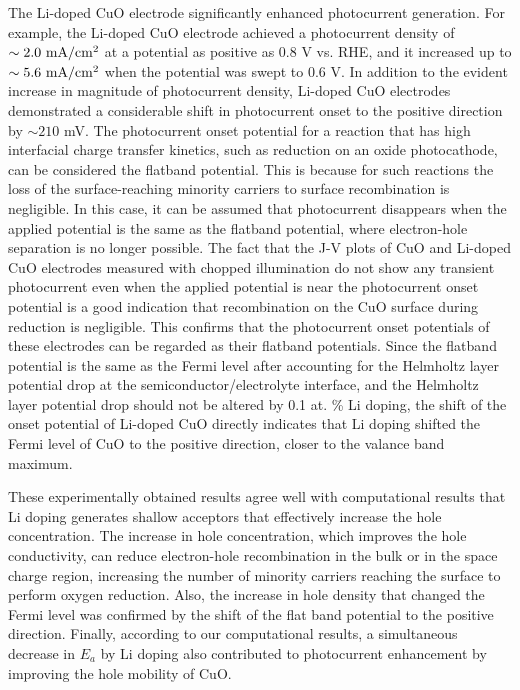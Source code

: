 The Li-doped CuO electrode significantly enhanced photocurrent generation. For example, the Li-doped CuO electrode achieved a photocurrent density of $\sim 2.0\ {\rm mA/cm^2}$ at a potential as positive as 0.8 V vs. RHE, and it increased up to $\sim 5.6\ {\rm mA/cm^2}$ when the potential was swept to 0.6 V. In addition to the evident increase in magnitude of photocurrent density, Li-doped CuO electrodes demonstrated a considerable shift in photocurrent onset to the positive direction by $\sim 210$ mV. The photocurrent onset potential for a reaction that has high interfacial charge transfer kinetics, such as  reduction on an oxide photocathode, can be considered the flatband potential. This is because for such reactions the loss of the surface-reaching minority carriers to surface recombination is negligible.  In this case, it can be assumed that photocurrent disappears when the applied potential is the same as the flatband potential, where electron-hole separation is no longer possible.  The fact that the J-V plots of CuO and Li-doped CuO electrodes measured with chopped illumination do not show any transient photocurrent even when the applied potential is near the photocurrent onset potential is a good indication that recombination on the CuO surface during  reduction is negligible. This confirms that the photocurrent onset potentials of these electrodes can be regarded as their flatband potentials. Since the flatband potential is the same as the Fermi level after accounting for the Helmholtz layer potential drop at the semiconductor/electrolyte interface, and the Helmholtz layer potential drop should not be altered by 0.1 at. \% Li doping, the shift of the onset potential of Li-doped CuO directly indicates that Li doping shifted the Fermi level of CuO to the positive direction, closer to the valance band maximum.\cite{nozik1978photoelectrochemistry}

These experimentally obtained results agree well with computational results that Li doping generates shallow acceptors that effectively increase the hole concentration. The increase in hole concentration, which improves the hole conductivity, can reduce electron-hole recombination in the bulk or in the space charge region, increasing the number of minority carriers reaching the surface to perform oxygen reduction. Also, the increase in hole density that changed the Fermi level was confirmed by the shift of the flat band potential to the positive direction. Finally, according to our computational results, a simultaneous decrease in $E_a$ by Li doping also contributed to photocurrent enhancement by improving the hole mobility of CuO.

